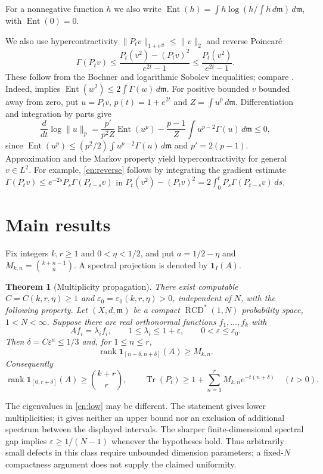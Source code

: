 \documentclass[12pt]{amsart}
\newtheorem{thm}{Theorem}[section]
\theoremstyle{definition}
\theoremstyle{remark}
\numberwithin{equation}{section}
\newcommand{\rank}{\operatorname{rank}}
\DeclareMathOperator{\Ent}{Ent}
\DeclareMathOperator{\Tr}{Tr}
\newcommand{\RCD}{\operatorname{RCD}^{*}}
\newcommand{\dm}{\,d\mathfrak m}
\newcommand{\one}{\mathbf 1}
\newcommand{\eps}{\varepsilon}
\theoremstyle{plain}
\begin{document}
For a nonnegative function $h$ we also write
$\Ent(h)=\int h\log(h/\int h\dm)\dm$, with $\Ent(0)=0$.

We also use hypercontractivity
$\|P_t v\|_{1+e^{2t}}\leq\|v\|_2$ and reverse Poincar\'e
\begin{equation}\label{en:reverse}
 \Gamma(P_tv)\leq\frac{P_t(v^2)-(P_tv)^2}{e^{2t}-1}
                  \leq\frac{P_t(v^2)}{e^{2t}-1}.
\end{equation}
These follow from the Bochner and logarithmic Sobolev inequalities;
compare \cite[Proposition 3.2]{en:BF}.
Indeed, \cite[Corollary 3.28]{en:EKS} implies
$\Ent(w^2)\leq2\int\Gamma(w)\dm$.
For positive bounded $v$ bounded away from zero, put $u=P_tv$,
$p(t)=1+e^{2t}$ and $Z=\int u^p\dm$. Differentiation and integration
by parts give
\[
 \frac{d}{dt}\log\|u\|_p
 =\frac{p'}{p^2Z}\Ent(u^p)
   -\frac{p-1}{Z}\int u^{p-2}\Gamma(u)\dm\leq0,
\]
since $\Ent(u^p)\leq(p^2/2)\int u^{p-2}\Gamma(u)\dm$ and
$p'=2(p-1)$. Approximation and the Markov property yield
hypercontractivity for general $v\in L^2$.
For example, \eqref{en:reverse} follows by integrating the gradient
estimate \cite[Corollary 3.5]{en:S}
$\Gamma(P_t v)\leq e^{-2s}P_s\Gamma(P_{t-s}v)$ in
$P_t(v^2)-(P_tv)^2=2\int_0^tP_s\Gamma(P_{t-s}v)\,ds$.

\section{Main results}
Fix integers $k,r\geq1$ and $0<\eta<1/2$, and put
$a=1/2-\eta$ and $M_{k,n}=\binom{k+n-1}{n}$.
A spectral projection is denoted by $\one_I(A)$.

\begin{thm}[Multiplicity propagation]\label{en:main}
There exist computable $C=C(k,r,\eta)\geq1$ and
$\eps_0=\eps_0(k,r,\eta)>0$, independent of $N$, with the following
property. Let $(X,d,\mathfrak m)$ be a compact $\RCD(1,N)$ probability
space, $1<N<\infty$. Suppose there are real orthonormal functions
$f_1,\ldots,f_k$ with
\begin{equation}\label{en:low}
 Af_i=\lambda_i f_i,\qquad 1\leq\lambda_i\leq1+\eps,
 \qquad 0<\eps\leq\eps_0.
\end{equation}
Then $\delta=C\eps^a\leq1/3$ and, for $1\leq n\leq r$,
\begin{equation}\label{en:rank}
 \rank\one_{[n-\delta,n+\delta]}(A)\geq M_{k,n}.
\end{equation}
Consequently
\begin{equation}\label{en:count}
 \rank\one_{[0,r+\delta]}(A)\geq\binom{k+r}{r},\qquad
 \Tr(P_t)\geq1+\sum_{n=1}^rM_{k,n}e^{-t(n+\delta)}\quad(t>0).
\end{equation}
\end{thm}
The eigenvalues in \eqref{en:low} may be different. The statement gives
lower multiplicities; it gives neither an upper bound nor an exclusion
of additional spectrum between the displayed intervals.
The sharper finite-dimensional spectral gap implies
$\eps\geq1/(N-1)$ whenever the hypotheses hold. Thus arbitrarily small
defects in this class require unbounded dimension parameters; a
fixed-$N$ compactness argument does not supply the claimed uniformity.
\end{document}
